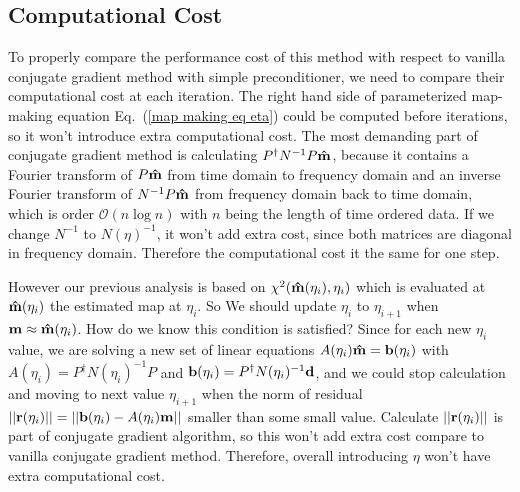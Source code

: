 \documentclass[twocolumn,linenumbers]{aastex631}
\newcommand{\vbd}{\vb{d}}
\newcommand{\vbm}{\vb{m}}
\newcommand{\vbb}{\vb{b}}
\newcommand{\inv}[1]{#1^{-1}}
\newcommand{\hatm}{\vb{\hat{m}}}
\newcommand{\Pdagger}{P^{\dagger}}
\begin{document}
\subsection{Computational Cost}
To properly compare the performance cost of this method with respect to vanilla
conjugate gradient method with simple preconditioner,
we need to compare their computational cost at each iteration.
The right hand side of parameterized map-making equation
Eq.~(\ref{map making eq eta})
could be computed before iterations,
so it won't introduce extra computational cost.
The most demanding part of conjugate gradient method is calculating
$\Pdagger \inv{N} P \hatm$, because it contains a Fourier transform of
$P\hatm$ from time domain to frequency domain and an inverse Fourier transform
of $\inv{N} P \hatm$ from frequency domain back to time domain,
which is order $\mathcal{O}(n\log n)$ with $n$ being the length of time ordered
data.
If we change $\inv{N}$ to $\inv{N(\eta)}$, it won't add extra cost,
since both matrices are diagonal in frequency domain.
Therefore the computational cost it the same for one step.

However our previous analysis is based on
$\chi^2(\hatm(\eta_i), \eta_i)$ which is evaluated at 
$\hatm(\eta_i)$ the estimated map at $\eta_i$.
So We should update $\eta_i$ to $\eta_{i+1}$ when $\vbm \approx \hatm(\eta_i)$. 
How do we know this condition is satisfied?
Since for each new $\eta_i$ value, we are solving a new set of linear
equations $A(\eta_i) \hatm = \vbb(\eta_i)$ with
$A(\eta_i) = \Pdagger \inv{N(\eta_i)} P$ and 
$\vbb(\eta_i) = \Pdagger \inv{N(\eta_i)} \vbd$,
and we could stop calculation and moving to next value $\eta_{i+1}$ when the 
norm of residual 
$\qty||\vb{r}(\eta_i)|| = \qty||\vbb(\eta_i) - A(\eta_i) \vbm||$
smaller than some small value.
Calculate $\qty||\vb{r}(\eta_i)||$ is part of conjugate gradient algorithm,
so this won't add extra cost compare to vanilla conjugate gradient method.
Therefore, overall introducing $\eta$ won't have extra computational cost.
\end{document}
